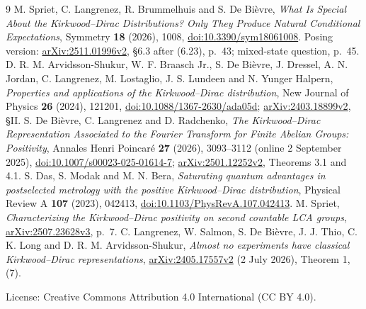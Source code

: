 \documentclass[11pt]{article}
\begin{document}
\begingroup\small
\begin{thebibliography}{9}
M. Spriet, C. Langrenez, R. Brummelhuis and S. De Bi\`evre,
\emph{What Is Special About the Kirkwood--Dirac Distributions?
Only They Produce Natural Conditional Expectations},
Symmetry \textbf{18} (2026), 1008,
\href{https://doi.org/10.3390/sym18061008}{doi:10.3390/sym18061008}.
Posing version: \href{https://arxiv.org/abs/2511.01996v2}{arXiv:2511.01996v2},
\S6.3 after (6.23), p.~43; mixed-state question, p.~45.
D. R. M. Arvidsson-Shukur, W. F. Braasch Jr., S. De Bi\`evre, J. Dressel,
A. N. Jordan, C. Langrenez, M. Lostaglio, J. S. Lundeen and N. Yunger Halpern,
\emph{Properties and applications of the Kirkwood--Dirac distribution},
New Journal of Physics \textbf{26} (2024), 121201,
\href{https://doi.org/10.1088/1367-2630/ada05d}{doi:10.1088/1367-2630/ada05d};
\href{https://arxiv.org/abs/2403.18899v2}{arXiv:2403.18899v2}, \S II.
S. De Bi\`evre, C. Langrenez and D. Radchenko,
\emph{The Kirkwood--Dirac Representation Associated to the Fourier
Transform for Finite Abelian Groups: Positivity},
Annales Henri Poincar\'e \textbf{27} (2026), 3093--3112 (online 2 September 2025),
\href{https://doi.org/10.1007/s00023-025-01614-7}{doi:10.1007/s00023-025-01614-7};
\href{https://arxiv.org/abs/2501.12252v2}{arXiv:2501.12252v2}, Theorems 3.1 and 4.1.
S. Das, S. Modak and M. N. Bera,
\emph{Saturating quantum advantages in postselected metrology with the
positive Kirkwood--Dirac distribution},
Physical Review A \textbf{107} (2023), 042413,
\href{https://doi.org/10.1103/PhysRevA.107.042413}{doi:10.1103/PhysRevA.107.042413}.
M. Spriet, \emph{Characterizing the Kirkwood--Dirac positivity on second
countable LCA groups},
\href{https://arxiv.org/abs/2507.23628v3}{arXiv:2507.23628v3}, p.~7.
C. Langrenez, W. Salmon, S. De Bi\`evre, J. J. Thio, C. K. Long and
D. R. M. Arvidsson-Shukur,
\emph{Almost no experiments have classical Kirkwood--Dirac representations},
\href{https://arxiv.org/abs/2405.17557v2}{arXiv:2405.17557v2}
(2 July 2026), Theorem 1, (7).
\end{thebibliography}
\endgroup
\medskip\noindent\small
License: Creative Commons Attribution 4.0 International (CC BY 4.0).
\end{document}
